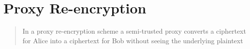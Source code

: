 \section{Proxy Re-encryption}

\begin{quote}
  In a proxy re-encryption scheme a semi-trusted proxy converts a ciphertext for Alice into a ciphertext for Bob without seeing the underlying plaintext \autocite{greenateniese:2006:article}
\end{quote}
